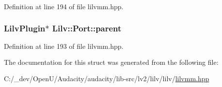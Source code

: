 Definition at line 194 of file lilvmm.\+hpp.

\subsubsection[{\texorpdfstring{parent}{parent}}]{ {\bf Lilv\+Plugin}$\ast$ Lilv\+::\+Port\+::parent}\hypertarget{struct_lilv_1_1_port_ada13694330de2f1388615194bde4e910}{}\label{struct_lilv_1_1_port_ada13694330de2f1388615194bde4e910}


Definition at line 193 of file lilvmm.\+hpp.



The documentation for this struct was generated from the following file\+:\begin{DoxyCompactItemize}
\item 
C\+:/\+\_\+dev/\+Open\+U/\+Audacity/audacity/lib-\/src/lv2/lilv/lilv/\hyperlink{lilvmm_8hpp}{lilvmm.\+hpp}\end{DoxyCompactItemize}
